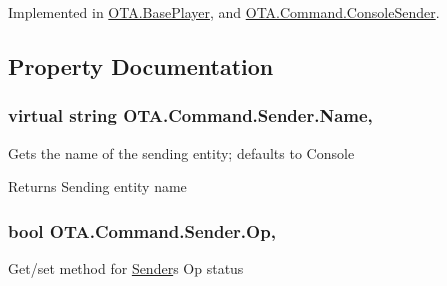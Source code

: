 Implemented in \hyperlink{class_o_t_a_1_1_base_player_a59a949bff7e0cb3588079ae55edf1e74}{O\+T\+A.\+Base\+Player}, and \hyperlink{class_o_t_a_1_1_command_1_1_console_sender_ab1569d02090c217a52d8e25f6846504c}{O\+T\+A.\+Command.\+Console\+Sender}.



\subsection{Property Documentation}
\hypertarget{class_o_t_a_1_1_command_1_1_sender_a01e7bc91f3e89c2cda1d98301c97e56c}{}
\subsubsection[{Name}]{\setlength{\rightskip}{0pt plus 5cm}virtual string O\+T\+A.\+Command.\+Sender.\+Name\hspace{0.3cm}{\ttfamily [get]}, {}}\label{class_o_t_a_1_1_command_1_1_sender_a01e7bc91f3e89c2cda1d98301c97e56c}


Gets the name of the sending entity; defaults to Console 

\begin{DoxyReturn}{Returns}
Sending entity name
\end{DoxyReturn}
\hypertarget{class_o_t_a_1_1_command_1_1_sender_a5c64601f60a1329fa849a391fa7f02b8}{}
\subsubsection[{Op}]{\setlength{\rightskip}{0pt plus 5cm}bool O\+T\+A.\+Command.\+Sender.\+Op\hspace{0.3cm}{\ttfamily [get]}, {\ttfamily [set]}}\label{class_o_t_a_1_1_command_1_1_sender_a5c64601f60a1329fa849a391fa7f02b8}


Get/set method for \hyperlink{class_o_t_a_1_1_command_1_1_sender}{Sender}\textquotesingle{}s Op status 

\hypertarget{class_o_t_a_1_1_command_1_1_sender_a37505848a1ead3678bd828309ae91a75}{}
